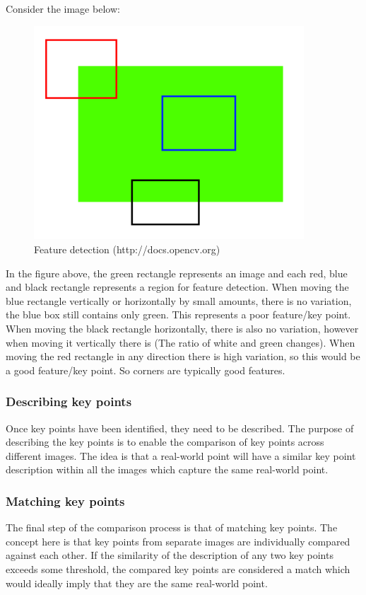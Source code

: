 \documentclass[11pt,a4paper]{report}
\begin{document}
				Consider the image below:
				
				\begin{figure}[H]
					\centering
					\includegraphics[width=0.9\textwidth]{feature_detection}
					\caption{Feature detection (http://docs.opencv.org)}
				\end{figure}
				
				In the figure above, the green rectangle represents an image and each red, blue and black rectangle represents a region for feature detection. When moving the blue rectangle vertically or horizontally by small amounts, there is no variation, the blue box still contains only green. This represents a poor feature/key point. 
				When moving the black rectangle horizontally, there is also no variation, however when moving it vertically there is (The ratio of white and green changes). When moving the red rectangle in any direction there is high variation, so this would be a good feature/key point. So corners are typically good features.
				
			\subsubsection{Describing key points}
				Once key points have been identified, they need to be described. The purpose of describing the key points is to enable the comparison of key points across different images. The idea is that a real-world point will have a similar key point description within all the images which capture the same real-world point.
				
			\subsubsection{Matching key points}
				The final step of the comparison process is that of matching key points. The concept here is that key points from separate images are individually compared against each other. If the similarity of the description of any two key points exceeds some threshold, the compared key points are considered a match which would ideally imply that they are the same real-world point.
		
\end{document}
